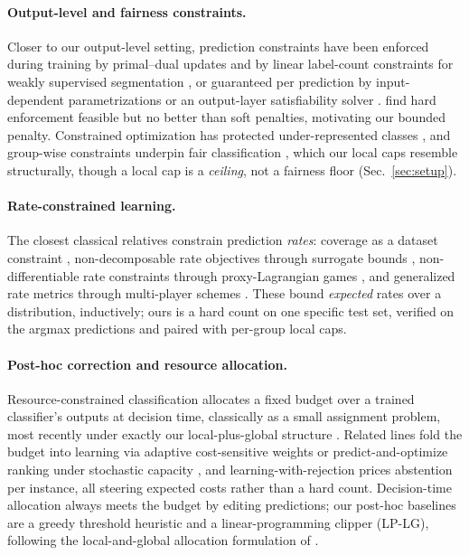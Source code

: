 \documentclass[10pt]{article}
\begin{document}
\paragraph{Output-level and fairness constraints.}
Closer to our output-level setting, prediction constraints have been enforced
during training by primal--dual updates \citep{nandwani2019primal} and by
linear label-count constraints for weakly supervised segmentation
\citep{pathak2015constrained}, or guaranteed per prediction by
input-dependent parametrizations \citep{brosowsky2021sample} or an
output-layer satisfiability solver \citep{goyal2024deepsade}.
\citet{marquez2017imposing} find hard enforcement feasible but no better than
soft penalties, motivating our bounded penalty. Constrained optimization has
protected under-represented classes \citep{sangalli2021constrained}, and
group-wise constraints underpin fair classification
\citep{bilal2015fairness,agarwal2018reductions,kearns2018preventing,donini2018empirical},
which our local caps resemble structurally, though a local cap is a
\emph{ceiling}, not a fairness floor (Sec.~\ref{sec:setup}).

\paragraph{Rate-constrained learning.}
The closest classical relatives constrain prediction \emph{rates}:
coverage as a dataset constraint \citep{goh2016satisfying}, non-decomposable
rate objectives through surrogate bounds \citep{eban2017scalable},
non-differentiable rate constraints through proxy-Lagrangian games
\citep{cotter2019optimization}, and generalized rate metrics through
multi-player schemes \citep{narasimhan2019optimizing}. These bound
\emph{expected} rates over a distribution, inductively; ours is a hard count
on one specific test set, verified on the argmax predictions and paired with
per-group local caps.

\paragraph{Post-hoc correction and resource allocation.}
Resource-constrained classification allocates a fixed budget over a trained
classifier's outputs at decision time, classically as a small assignment
problem, most recently under exactly our local-plus-global structure
\citep{shifman2025classification}. Related lines fold the budget into
learning via adaptive cost-sensitive weights \citep{shifman2023adaptive} or
predict-and-optimize ranking under stochastic capacity
\citep{vanderschueren2024new}, and learning-with-rejection
\citep{cortes2016learning} prices abstention per instance, all steering
expected costs rather than a hard count. Decision-time allocation always
meets the budget by editing predictions; our post-hoc baselines are a greedy
threshold heuristic and a linear-programming clipper (LP-LG), following
the local-and-global allocation formulation of
\citet{shifman2025classification}.
\end{document}

